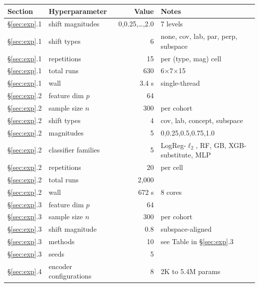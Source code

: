 \begin{center}
\begin{tabular}{llrl}
\toprule
Section & Hyperparameter & Value & Notes \\
\midrule
\S\ref{sec:exp}.1 & shift magnitudes        & 0,0.25,\dots,2.0 & 7 levels  \\
\S\ref{sec:exp}.1 & shift types             & 6                & none, cov, lab, par, perp, subspace  \\
\S\ref{sec:exp}.1 & repetitions             & 15               & per (type, mag) cell  \\
\S\ref{sec:exp}.1 & total runs              & 630              & 6$\times$7$\times$15  \\
\S\ref{sec:exp}.1 & wall                    & 3.4 s            & single-thread  \\
\midrule
\S\ref{sec:exp}.2 & feature dim $p$         & 64               &   \\
\S\ref{sec:exp}.2 & sample size $n$         & 300              & per cohort  \\
\S\ref{sec:exp}.2 & shift types             & 4                & cov, lab, concept, subspace  \\
\S\ref{sec:exp}.2 & magnitudes              & 5                & 0,0.25,0.5,0.75,1.0  \\
\S\ref{sec:exp}.2 & classifier families     & 5                & LogReg-$\ell_2$, RF, GB, XGB-substitute, MLP  \\
\S\ref{sec:exp}.2 & repetitions             & 20               & per cell  \\
\S\ref{sec:exp}.2 & total runs              & 2{,}000          &   \\
\S\ref{sec:exp}.2 & wall                    & 672 s            & 8 cores  \\
\midrule
\S\ref{sec:exp}.3 & feature dim $p$         & 64               &   \\
\S\ref{sec:exp}.3 & sample size $n$         & 300              & per cohort  \\
\S\ref{sec:exp}.3 & shift magnitude         & 0.8              & subspace-aligned  \\
\S\ref{sec:exp}.3 & methods                 & 10               & see Table in \S\ref{sec:exp}.3  \\
\S\ref{sec:exp}.3 & seeds                   & 5                &   \\
\midrule
\S\ref{sec:exp}.4 & encoder configurations  & 8                & 2K to 5.4M params  \\

\end{tabular}
\end{center}
